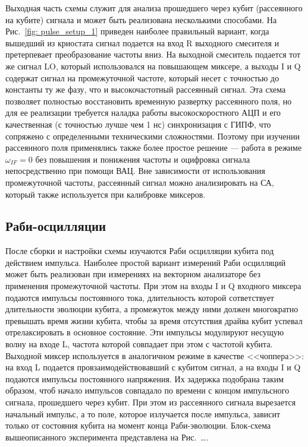 Выходная часть схемы служит для анализа прошедшего через кубит (рассеянного на кубите) сигнала и может быть реализована несколькими способами. На Рис.~\ref{fig: pulse_setup_1} приведен наиболее правильный вариант, когда вышедший из криостата сигнал подается на вход R выходного смесителя и  претерпевает преобразование частоты вниз. На выходной смеситель подается тот же сигнал LO, который использовался на повышающем миксере, а выходы I и Q содержат сигнал на промежуточной частоте, который несет с точностью до константы ту же фазу, что и высокочастотный рассеянный сигнал. Эта схема позволяет полностью восстановить временную развертку рассеянного поля, но для ее реализации требуется наладка работы высокоскоростного АЦП и его качественная (с точностью лучше чем 1 нс) синхронизация с ГИПФ, что сопряжено с определенными техническими сложностями. Поэтому при изучении рассеянного поля применялись также более простое решение --- работа в режиме $\omega_{IF}=0$ без повышения и понижения частоты и оцифровка сигнала непосредственно при помощи ВАЦ. Вне зависимости от использования промежуточной частоты, рассеянный сигнал можно анализировать на СА, который также используется при калибровке миксеров. 

\subsection{Раби-осцилляции}
После сборки и настройки схемы изучаются Раби осцилляции кубита под действием импульса. Наиболее простой вариант измерений Раби осцилляций может быть реализован при измерениях на векторном анализаторе без применения промежуточной частоты. При этом на входы I и Q входного миксера подаются импульсы постоянного тока, длительность которой сответствует длительности эволюции кубита, а промежуток между ними должен многократно превышать время жизни кубита, чтобы за время отсутствия драйва кубит успевал отрелаксировать в основное состояние. Эти импульсы модулируют несущую волну на входе L, частота которой совпадает при этом с частотой кубита. Выходной миксер используется в аналогичном режиме в качестве <<чоппера>>: на вход L подается провзаимодействовавший с кубитом сигнал, а на входы I и Q подаются импульсы постоянного напряжения. Их задержка подобрана таким образом, чтоб начало импульсов совпадало по времени с концом импульсного сигнала, прошедшего через кубит. При этом из рассеянного сигнала вырезается начальный импульс, а то поле, которое излучается после импульса, зависит только от состояния кубита на момент конца Раби-эволюции. Блок-схема вышеописанного эксперимента представлена на Рис.~\ldots.

